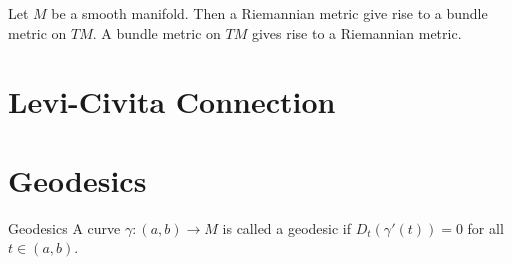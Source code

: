 \documentclass[a4paper]{article}
\begin{document}
\begin{prp}{}{} Let $M$ be a smooth manifold. Then a Riemannian metric give rise to a bundle metric on $TM$. A bundle metric on $TM$ gives rise to a Riemannian metric. 
\end{prp}

\pagebreak
\section{Levi-Civita Connection}

\pagebreak
\section{Geodesics}
\begin{defn}{Geodesics}{} A curve $\gamma:(a,b)\to M$ is called a geodesic if $D_t(\gamma'(t))=0$ for all $t\in(a,b)$. 
\end{defn}
\end{document}

